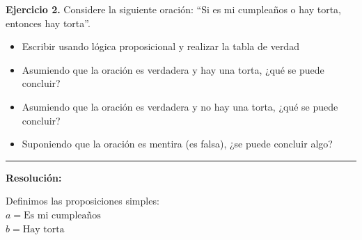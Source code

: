 \hypertarget{ej2}{}
\noindent \textbf{Ejercicio 2.} Considere la siguiente oración: ``Si es mi cumpleaños o hay torta, entonces hay torta''.
\begin{itemize}
    \item Escribir usando lógica proposicional y realizar la tabla de verdad
    \item Asumiendo que la oración es verdadera y hay una torta, ¿qué se puede concluir?
    \item Asumiendo que la oración es verdadera y no hay una torta, ¿qué se puede concluir?
    \item Suponiendo que la oración es mentira (es falsa), ¿se puede concluir algo?
\end{itemize}

\vspace{0.2cm}
{\color{gray}\hrule}
\vspace{0.4cm}

\textbf{Resolución:}

Definimos las proposiciones simples: \\
$a = \text{Es mi cumpleaños}$ \\
$b = \text{Hay torta}$

